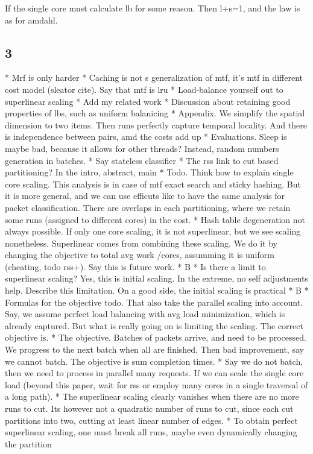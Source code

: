 If the single core must calculate lb for some reason. Then l+s=1, and the law is as for amdahl.


\subsection{3}



* Mrf is only harder
* Caching is not s generalization of mtf, it's mtf in different cost model (sleator cite). Say that mtf is lru
* Load-balance yourself out to superlinear scaling
* Add my related work
* Discussion about retaining good properties of lbs, such as uniform balanicing
* Appendix. We simplify the spatial dimension to two items. Then runs perfectly capture temporal locality. And there is independence between pairs, amd the costs add up
* Evaluations. Sleep is maybe bad, because it allows for other threads? Instead, random numbers generation in batches.
* Say stateless classifier
* The rss link to cut based partitioning? In the intro, abstract, main
* Todo. Think how to explain single core scaling. This analysis is in case of mtf exact search and sticky hashing. But it is more general, and we can use efficuts like to have the same analysis for packet classification. There are overlaps in each partitioning, where we retain some runs (assigned to different cores) in the cost.
* Hash table degeneration not always possible. If only one core scaling, it is not superlinear, but we see scaling nonetheless. Superlinear comes from combining these scaling. We do it by changing the objective to total avg work /cores, assumming it is uniform (cheating, todo rss+). Say this is future work.
* B
* Is there a limit to superlinear scaling? Yes, this is initial scaling. In the extreme, no self adjustments help. Describe this limitation. On a good side, the initial scaling is practical
* B
* Formulas for the objective todo. That also take the parallel scaling into account. Say, we assume perfect load balancing with avg load minimization, which is already captured. But what is really going on is limiting the scaling. The correct objective is.
* The objective. Batches of packets arrive, and need to be processed. We progress to the next batch when all are finished. Then bad improvement, say we cannot batch. The objective is sum completion times.
* Say we do not batch, then we need to process in parallel many requests. If we can scale the single core load (beyond this paper, wait for rss or employ many cores in a single traversal of a long path).
* The superlinear scaling clearly vanishes when there are no more runs to cut. Its however not a quadratic number of runs to cut, since each cut partitions into two, cutting at least linear number of edges.
* To obtain perfect superlinear scaling, one must break all runs, maybe even dynamically changing the partition




